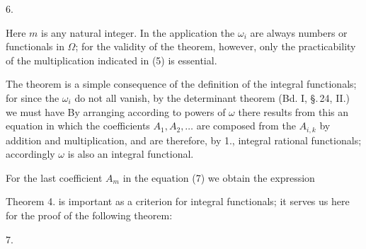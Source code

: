 6. 

Here $m$ is any natural integer. In the application the $\omega_i$ are always numbers or functionals in $\Omega$; for the validity of the theorem, however, only the practicability of the multiplication indicated in (5) is essential.

The theorem is a simple consequence of the definition of the integral functionals; for since the $\omega_i$ do not all vanish, by the determinant theorem (Bd. I, §.\,24, II.) we must have
By arranging according to powers of $\omega$ there results from this an equation
in which the coefficients $A_1, A_2, \ldots$ are composed from the $A_{i,k}$ by addition and multiplication, and are therefore, by 1., integral rational functionals; accordingly $\omega$ is also an integral functional.

For the last coefficient $A_m$ in the equation (7) we obtain the expression

Theorem 4. is important as a criterion for integral functionals; it serves us here for the proof of the following theorem: %

7. 
